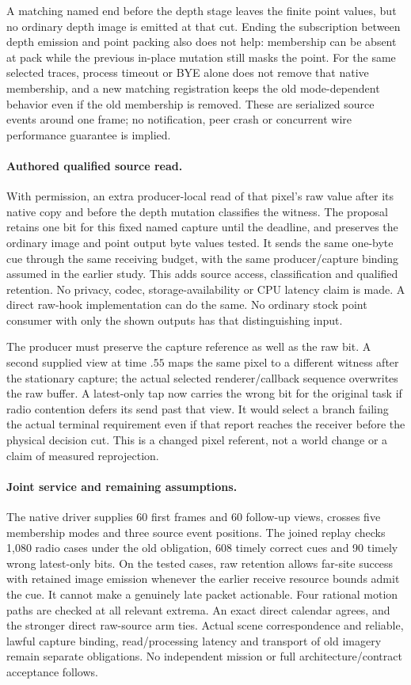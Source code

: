 \documentclass{article}
\begin{document}
A matching named end before the depth stage leaves the finite
point values, but no ordinary depth image is emitted at that
cut. Ending the subscription between depth emission and point
packing also does not help: membership can be absent at pack
while the previous in-place mutation still masks the point.
For the same selected traces, process timeout or BYE alone
does not remove that native membership, and a new matching
registration keeps the old mode-dependent behavior even if the
old membership is removed. These are serialized source events
around one frame; no notification, peer crash or concurrent
wire performance guarantee is implied.

\paragraph{Authored qualified source read.}
With permission, an extra producer-local read of that pixel's
raw value after its native copy and before the depth mutation
classifies the witness. The proposal retains one bit for this
fixed named capture until the deadline, and preserves the
ordinary image and point output byte values tested. It sends
the same one-byte cue through the same receiving budget, with
the same producer/capture binding assumed in the earlier study.
This adds source access, classification and qualified retention.
No privacy, codec, storage-availability or CPU latency claim
is made. A direct raw-hook implementation can do the same.
No ordinary stock point consumer with only the shown outputs
has that distinguishing input.

The producer must preserve the capture reference as well as
the raw bit. A second supplied view at time $.55$ maps the
same pixel to a different witness after the stationary capture;
the actual selected renderer/callback sequence overwrites the
raw buffer. A latest-only tap now carries the wrong bit for
the original task if radio contention defers its send past
that view. It would select a branch failing the actual
terminal requirement even if that report reaches the receiver
before the physical decision cut. This is a changed pixel
referent, not a world change or a claim of measured reprojection.

\paragraph{Joint service and remaining assumptions.}
The native driver supplies 60 first frames and 60 follow-up
views, crosses five membership modes and three source event
positions. The joined replay checks 1,080 radio cases under
the old obligation, 608 timely correct cues and 90 timely
wrong latest-only bits. On the tested cases, raw retention
allows far-site success with retained image emission whenever
the earlier receive resource bounds admit the cue. It cannot
make a genuinely late packet actionable. Four rational motion
paths are checked at all relevant extrema. An exact direct
calendar agrees, and the stronger direct raw-source arm ties.
Actual scene correspondence and reliable, lawful capture
binding, read/processing latency and transport of old imagery
remain separate obligations. No independent mission or full
architecture/contract acceptance follows.
\end{document}
